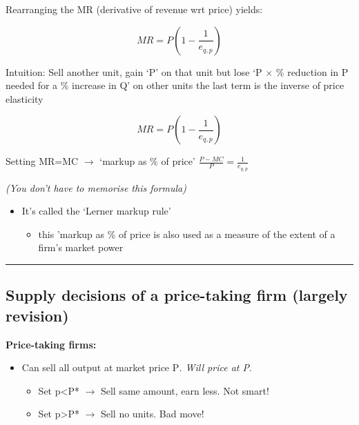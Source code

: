 \documentclass[]{article}
\providecommand{\tightlist}{%
  \setlength{\itemsep}{0pt}\setlength{\parskip}{0pt}}
\begin{document}
\bigskip

Rearranging the MR (derivative of revenue wrt price) yields:

\[MR= P(1-\frac{1}{e_{q,p}})\]

Intuition: Sell another unit, gain `P' on that unit but lose `P
\(\times\) \% reduction in P needed for a \% increase in Q' on other
units the last term is the inverse of price elasticity

\[MR= P(1-\frac{1}{e_{q,p}})\]

Setting MR=MC \(\rightarrow\) `markup as \% of price'
\(\frac{P-MC}{P}=\frac{1}{e_{q,p}}\)

\emph{(You don't have to memorise this formula)}

\begin{itemize}
\tightlist
\item
  It's called the `Lerner markup rule'

  \begin{itemize}
  \tightlist
  \item
    this 'markup as \% of price is also used as a measure of the extent
    of a firm's market power
  \end{itemize}
\end{itemize}

\begin{center}\rule{0.5\linewidth}{\linethickness}\end{center}

\hypertarget{supply-decisions-of-a-price-taking-firm-largely-revision}{%
\subsection{Supply decisions of a price-taking firm (largely
revision)}\label{supply-decisions-of-a-price-taking-firm-largely-revision}}

\textbf{Price-taking firms:}

\begin{itemize}
\tightlist
\item
  Can sell all output at market price P\emph{. Will price at P}.

  \begin{itemize}
  \tightlist
  \item
    Set p\textless P* \(\rightarrow\) Sell same amount, earn less. Not
    smart!
  \item
    Set p\textgreater P* \(\rightarrow\) Sell no units. Bad move!
  \end{itemize}
\end{itemize}
\end{document}
